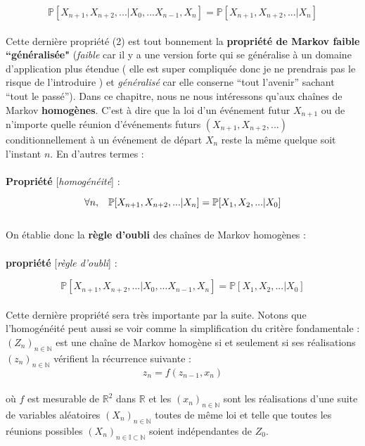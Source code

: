 \documentclass[english]{article}
\begin{document}
\begin{equation}
\displaystyle \mathbb{P} [ X_{n+1},X_{n+2}, ... \vert X_0, ... X_{n-1}, X_n] = \mathbb{P}[ X_{n+1},X_{n+2}, ... \vert X_n]
\end{equation}
\\
Cette dernière propriété (2) est tout bonnement la \textbf{propriété de Markov faible ``généralisée"} (\textit{faible} car il y a une version forte qui se généralise à un domaine d'application plus étendue \textsf{( elle est super compliquée donc je ne prendrais pas le risque de l'introduire )} et \textit{généralisé} car elle conserne ``tout l'avenir'' sachant ``tout le passé''). Dans ce chapitre, nous ne nous intéressons qu'aux cha\^ines de Markov \textbf{homogènes}. C'est à dire que la loi d'un événement futur $X_{n+1}$ ou de n'importe quelle réunion d’événements futurs $(X_{n+1},X_{n+2}, ...)$ conditionnellement à un événement de départ $X_n$ reste la même quelque soit l'instant $n$. En d'autres termes :\\
\\
\textbf{Propriété} [\textit{homogénéité}] :

\begin{equation}
\displaystyle \forall n,\hspace{3mm}\mathbb{P}[ X_{n+1},X_{n+2}, ... \vert X_n] = \mathbb{P}[ X_{1},X_{2}, ... \vert X_0]
\end{equation}
\\
On établie donc la \textbf{règle d'oubli} des cha\^ines de Markov homogènes :\\
\\
\textbf{propriété} [\textit{règle d'oubli}] :

\begin{equation}
\displaystyle \mathbb{P} [ X_{n+1},X_{n+2}, ... \vert X_0, ... X_{n-1}, X_n] = \mathbb{P}[ X_{1},X_{2}, ... \vert X_0]
\end{equation}
\\
Cette dernière propriété sera très importante par la suite. Notons que l'homogénéité peut aussi se voir comme la simplification du critère fondamentale : $(Z_n)_{n\in\mathbb{N}}$ est une cha\^ ine de Markov homogène si et seulement si ses réalisations $(z_n)_{n\in\mathbb{N}}$ vérifient la récurrence suivante :
\[z_n = \mathit{f}(z_{n-1},x_n)\]
\\
où $\mathit{f}$ est mesurable de $\mathbb{R}^2$ dans $\mathbb{R}$ et les $(x_n)_{n\in\mathbb{N}}$ sont les réalisations d'une suite de variables aléatoires $(X_n)_{n\in\mathbb{N}}$ toutes de même loi et telle que toutes les réunions possibles $(X_n)_{n\in\mathbb{I}\subset\mathbb{N}}$ soient indépendantes de $Z_0$.
\end{document}
